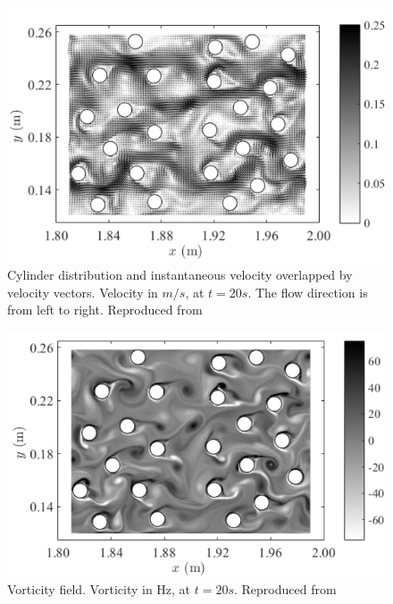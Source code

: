  \begin{figure}[htbp!]
    \centering
    \includegraphics{Figures/research_papers/Canelas2016-vel-field.png}
    \caption{Cylinder distribution and instantaneous velocity overlapped by velocity vectors. Velocity in $m/s$, at $t=20s$. The flow direction is from left to right. Reproduced from \cite{Canelas2016}}
    \label{fig:Canelas2016-vel-field}
\end{figure}
\begin{figure}[htbp!]
    \centering
    \includegraphics{Figures/research_papers/Canelas2016-vorticity-field.png}
    \caption{Vorticity field. Vorticity in Hz, at $t = 20s$. Reproduced from \cite{Canelas2016}}
    \label{fig:Canelas2016-vorticity-field}
\end{figure}
